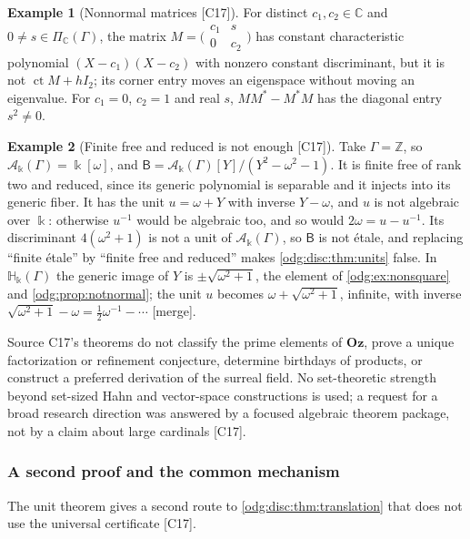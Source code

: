 \documentclass[11pt,oneside]{article}
\numberwithin{equation}{section}
\theoremstyle{definition}
\newtheorem{example}[example]{Example}
\theoremstyle{remark}
\newcommand{\Oz}{\mathbf{Oz}}
\newcommand{\Z}{\mathbb Z}
\newcommand{\C}{\mathbb C}
\newcommand{\ct}{\operatorname{ct}}
\newcommand{\src}[1]{\textup{\textsf{\small[#1]}}}
\newcommand{\mergetag}{\textup{\textsf{\small[merge]}}}
\newcommand{\crH}{\mathbb H_\Bbbk(\Gamma)}
\newcommand{\crA}{\mathcal A_\Bbbk(\Gamma)}
\begin{document}
\begin{example}[Nonnormal matrices \src{C17}]\label{odg:disc:ex:nonnormal}
For distinct $c_1,c_2\in\C$ and $0\ne s\in\Pi_\C(\Gamma)$, the matrix
$M=\bigl(\begin{smallmatrix}c_1&s\\0&c_2\end{smallmatrix}\bigr)$ has constant
characteristic polynomial $(X-c_1)(X-c_2)$ with nonzero constant discriminant, but it is
not $\ct M+hI_2$; its corner entry moves an eigenspace without moving an eigenvalue. For
$c_1=0$, $c_2=1$ and real $s$, $MM^*-M^*M$ has the diagonal entry $s^2\ne0$.
\end{example}

\begin{example}[Finite free and reduced is not enough \src{C17}]\label{odg:disc:ex:nonetale}
Take $\Gamma=\Z$, so $\crA=\Bbbk[\omega]$, and
$\mathsf B=\crA[Y]/(Y^2-\omega^2-1)$. It is finite free of rank two and reduced, since its
generic polynomial is separable and it injects into its generic fiber. It has the unit
$u=\omega+Y$ with inverse $Y-\omega$, and $u$ is not algebraic over $\Bbbk$: otherwise
$u^{-1}$ would be algebraic too, and so would $2\omega=u-u^{-1}$. Its discriminant
$4(\omega^2+1)$ is not a unit of $\crA$, so $\mathsf B$ is not \'etale, and replacing
``finite \'etale'' by ``finite free and reduced'' makes \cref{odg:disc:thm:units} false.
In $\crH$ the generic image of $Y$ is $\pm\sqrt{\omega^2+1}$, the element of
\cref{odg:ex:nonsquare} and \cref{odg:prop:notnormal}; the unit $u$ becomes
$\omega+\sqrt{\omega^2+1}$, infinite, with inverse
$\sqrt{\omega^2+1}-\omega=\tfrac12\omega^{-1}-\cdots$ \mergetag.
\end{example}

Source C17's theorems do not classify the prime elements of $\Oz$, prove a unique
factorization or refinement conjecture, determine birthdays of products, or construct a
preferred derivation of the surreal field. No set-theoretic strength beyond set-sized Hahn
and vector-space constructions is used; a request for a broad research direction was
answered by a focused algebraic theorem package, not by a claim about large cardinals
\src{C17}.

\subsubsection{A second proof and the common mechanism}\label{odg:disc:sub:second}

The unit theorem gives a second route to \cref{odg:disc:thm:translation} that does not use
the universal certificate \src{C17}.
\end{document}
